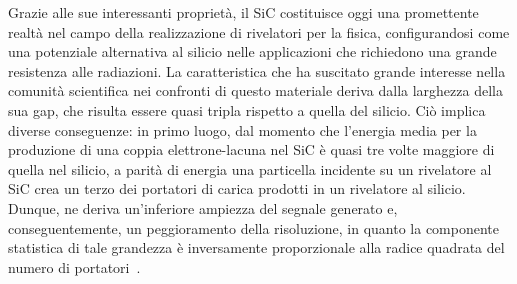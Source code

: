 Grazie alle sue interessanti proprietà, il SiC costituisce oggi una promettente realtà nel campo della realizzazione di rivelatori per la fisica, configurandosi come una potenziale alternativa al silicio nelle applicazioni che richiedono una grande resistenza alle radiazioni.
%
La caratteristica che ha suscitato grande interesse nella comunità scientifica nei confronti di questo materiale deriva dalla larghezza della sua gap, che risulta essere quasi tripla rispetto a quella del silicio.
Ciò implica diverse conseguenze: in primo luogo, dal momento che l'energia media per la produzione di una coppia elettrone-lacuna nel SiC è quasi tre volte maggiore di quella nel silicio, a parità di energia una particella incidente su un rivelatore al SiC crea un terzo dei portatori di carica prodotti in un rivelatore al silicio.
Dunque, ne deriva un'inferiore ampiezza del segnale generato e, conseguentemente, un peggioramento della risoluzione, in quanto la componente statistica di tale grandezza è inversamente proporzionale alla radice quadrata del numero di portatori~\cite{knoll:10}.
%
